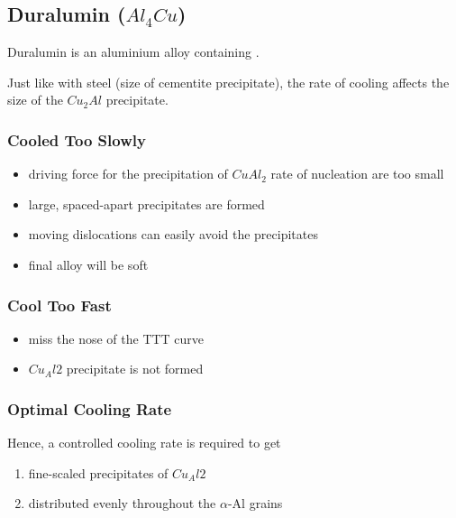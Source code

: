 
\subsection{Duralumin ($Al_4Cu$)} %
\label{sub:duralumins}

Duralumin is an aluminium alloy containing .


Just like with steel (size of cementite precipitate), the rate of cooling affects the size of the $Cu_2Al$ precipitate.

\subsubsection{Cooled Too Slowly} %
\label{ssub:cooled_too_slowly}

\begin{itemize}
  \item driving force for the precipitation of $CuAl_2$ rate of nucleation are too small
  \item large, spaced-apart precipitates are formed
  \item moving dislocations can easily avoid the precipitates
  \item final alloy will be soft
\end{itemize}

\subsubsection{Cool Too Fast} %
\label{ssub:cool_too_fast}

\begin{itemize}
  \item miss the nose of the TTT curve
  \item $Cu_Al2$ precipitate is not formed
\end{itemize}

\subsubsection{Optimal Cooling Rate} %
\label{ssub:optimal_cooling_rate}


Hence, a controlled cooling rate is required to get
\begin{enumerate}
  \item fine-scaled precipitates of $Cu_Al2$
  \item distributed evenly throughout the $\alpha$-Al grains
\end{enumerate}

